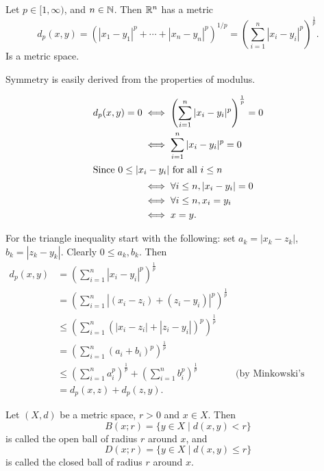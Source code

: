 \documentclass[10pt, a4paper]{article}
\begin{document}
\begin{example}
    Let $p \in [1, \infty)$,
    and $n \in \mathbb{N}$.
    Then $\mathbb{R} ^ n$ has a metric
    \[
    d_p(x, y) = (|x_1 - y_1| ^ p + \dotsi + |x_n - y_n| ^ p) ^ {1 / p} = \left(\sum_{i = 1}^{n}|x_i - y_i| ^ p\right) ^ {\frac{1}{p}}.
    \]
    Is a metric space.

    \begin{solution}
        Symmetry is easily derived from the properties of modulus.

        \begin{align*}
            d_p(x, y) = 0 &\iff \left(\sum_{i = 1}^{n}|x_i - y_i| ^ p\right) ^ {\frac{1}{p}} = 0 \\
            &\iff \sum_{i = 1}^{n}|x_i - y_i| ^ p = 0 \\
            \intertext{Since $0 \leq |x_i - y_i|$ for all $i \leq n$}
            &\iff \forall i \leq n, |x_i - y_i| = 0 \\
            &\iff \forall i \leq n, x_i = y_i \\
            &\iff x = y.
        \end{align*}

        For the triangle inequality start with the following:
        set $a_k = |x_k - z_k|$,
        $b_k = |z_k - y_k|$.
        Clearly $0 \leq a_k, b_k$.
        Then
        \begin{align*}
            d_p(x, y) &= \left(\sum_{i = 1}^{n}|x_i - y_i| ^ p\right) ^ {\frac{1}{p}} \\
            &= \left(\sum_{i = 1}^{n}|(x_i - z_i) + (z_i - y_i)| ^ p\right) ^ {\frac{1}{p}} \\
            &\leq \left(\sum_{i = 1}^{n}(|x_i - z_i| + |z_i - y_i|) ^ p\right) ^ {\frac{1}{p}} \\
            &= \left(\sum_{i = 1}^{n}(a_i + b_i) ^ p\right) ^ {\frac{1}{p}} \\
            &\leq \left(\sum_{i = 1}^{n}a_i ^ p\right) ^ {\frac{1}{p}} + \left(\sum_{i = 1}^{n}b_i ^ p\right) ^ {\frac{1}{p}} &\text{(by Minkowski's inequality)} \\
            &= d_p(x, z) + d_p(z, y).
        \end{align*}
    \end{solution}
\end{example}

\begin{definition}
    Let $(X, d)$ be a metric space,
    $r > 0$ and $x \in X$.
    Then
    \[
    B(x; r) = \{y \in X\mid d(x, y) < r\}
    \]
    is called the open ball of radius $r$ around $x$,
    and
    \[
    D(x; r) = \{y \in X\mid d(x, y) \leq r\}
    \]
    is called the closed ball of radius $r$ around $x$.
\end{definition}
\end{document}
